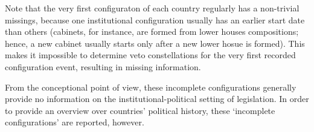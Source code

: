 Note that the very first configuraton of each country regularly has a non-trivial missings,
because one institutional configuration usually has an earlier start date than others
(cabinets, for instance, are formed from lower houses compositions; hence, a new cabinet usually starts only after a new lower hosue is formed).
This makes it impossible to determine veto constellations for the very first recorded configuration event, resulting in missing information.

From the conceptional point of view, these incomplete configurations generally provide no information on the institutional-political setting of legislation. 
In order to provide an overview over countries' political history, these `incomplete configurations' are reported, however.

